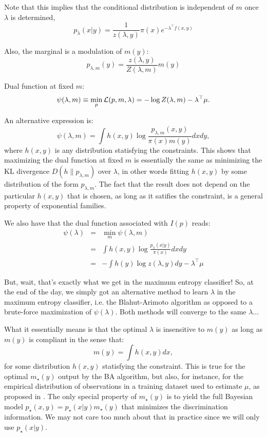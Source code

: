 \documentclass[english]{scrartcl}
\begin{document}
Note that this implies that the conditional distribution is
independent of $m$ once $\lambda$ is determined,
$$
p_\lambda(x|y) = \frac{1}{z(\lambda,y)} \pi(x) e^{-\lambda^\top f(x,y)} 
$$

Also, the marginal is a modulation of $m(y)$:
$$
p_{\lambda,m}(y) = \frac{z(\lambda,y)}{Z(\lambda,m)} m(y)
$$

Dual function at fixed $m$:
$$
\psi(\lambda,m) 
\equiv \min_p {\cal L}(p,m,\lambda)
= 
- \log Z(\lambda,m) - \lambda^\top \mu
.
$$ 

An alternative expression is:
$$
\psi(\lambda, m)
= 
\int h(x,y) 
\log \frac{p_{\lambda,m}(x,y)}{\pi(x)m(y)} dxdy,
$$ where $h(x,y)$ is any distribution statisfying the
constraints. This shows that maximizing the dual function at fixed $m$
is essentially the same as minimizing the KL divergence
$D(h\|p_{\lambda,m})$ over $\lambda$, in other words fitting $h(x,y)$
by some distribution of the form $p_{\lambda,m}$. The fact that the
result does not depend on the particular $h(x,y)$ that is chosen, as
long as it satifies the constraint, is a general property of
exponential families.

We also have that the dual function associated with $I(p)$ reads:
\begin{eqnarray*}
\psi(\lambda) 
 & = & \min_m \psi(\lambda, m)\\
 & = & \int h(x,y) \log \frac{p_{\lambda}(x|y)}{\pi(x)} dxdy\\
 & = & -\int h(y) \log z(\lambda,y) dy - \lambda^\top \mu
\end{eqnarray*}

But, wait, that's exactly what we get in the maximum entropy
classifier! So, at the end of the day, we simply got an alternative
method to learn $\lambda$ in the maximum entropy classifier, i.e. the
Blahut-Arimoto algorithm as opposed to a brute-force maximization of
$\psi(\lambda)$. Both methods will converge to the same $\lambda$...

What it essentially means is that the optimal $\lambda$ is insensitive
to $m(y)$ as long as $m(y)$ is compliant in the sense that:
$$
m(y) = \int h(x,y) dx,
$$ for some distribution $h(x,y)$ statisfying the constraint. This is
true for the optimal $m_\star(y)$ output by the BA algorithm, but
also, for instance, for the empirical distribution of observations in
a training dataset used to estimate $\mu$, as proposed in
\cite{BergerA-96}. The only special property of $m_\star(y)$ is to
yield the full Bayesian model $p_\star(x,y)=p_\star(x|y)m_\star(y)$
that minimizes the discrimination information. We may not care too
much about that in practice since we will only use $p_\star(x|y)$. 
\end{document}
